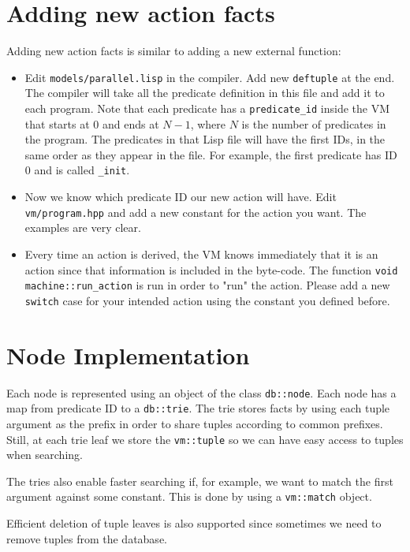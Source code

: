 \documentclass[11pt]{article}
\begin{document}
\section{Adding new action facts}

Adding new action facts is similar to adding a new external function:

\begin{itemize}
   \item Edit \texttt{models/parallel.lisp} in the compiler. Add new \texttt{deftuple} at the end. The compiler will take all the predicate definition in this file and add it to each program. Note that each predicate has a \texttt{predicate\_id} inside the VM that starts at $0$ and ends at $N-1$, where $N$ is the number of predicates in the program. The predicates in that Lisp file will have the first IDs, in the same order as they appear in the file. For example, the first predicate has ID 0 and is called \texttt{\_init}.
   \item Now we know which predicate ID our new action will have. Edit \texttt{vm/program.hpp} and add a new constant for the action you want. The examples are very clear.
   \item Every time an action is derived, the VM knows immediately that it is an action since that information is included in the byte-code. The function \texttt{void machine::run_action} is run in order to "run" the action. Please add a new \texttt{switch} case for your intended action using the constant you defined before.
\end{itemize}

\section{Node Implementation}

Each node is represented using an object of the class \texttt{db::node}. Each node has a map from predicate ID to a \texttt{db::trie}. The trie stores facts by using each tuple argument as the prefix in order to share tuples according to common prefixes. Still, at each trie leaf we store the \texttt{vm::tuple} so we can have easy access to tuples when searching.

The tries also enable faster searching if, for example, we want to match the first argument against some constant. This is done by using a \texttt{vm::match} object.

Efficient deletion of tuple leaves is also supported since sometimes we need to remove tuples from the database.
\end{document}
